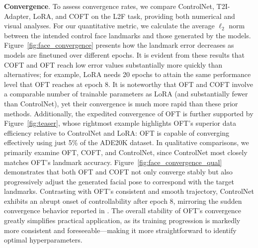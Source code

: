 \textbf{Convergence}. To assess convergence rates, we compare ControlNet, T2I-Adapter, LoRA, and COFT on the L2F task, providing both numerical and visual analyses. For our quantitative metric, we calculate the average $\ell_2$ norm between the intended control face landmarks and those generated by the models. Figure~\ref{fig:face_convergence} presents how the landmark error decreases as models are finetuned over different epochs. It is evident from these results that COFT and OFT reach low error values substantially more quickly than alternatives; for example, LoRA needs 20 epochs to attain the same performance level that OFT reaches at epoch 8. It is noteworthy that OFT and COFT involve a comparable number of trainable parameters as LoRA (and substantially fewer than ControlNet), yet their convergence is much more rapid than these prior methods. Additionally, the expedited convergence of OFT is further supported by Figure~\ref{fig:teaser}, whose rightmost example highlights OFT’s superior data efficiency relative to ControlNet and LoRA: OFT is capable of converging effectively using just 5\% of the ADE20K dataset. In qualitative comparisons, we primarily examine OFT, COFT, and ControlNet, since ControlNet most closely matches OFT’s landmark accuracy. Figure~\ref{fig:face_convergence_qual} demonstrates that both OFT and COFT not only converge stably but also progressively adjust the generated facial pose to correspond with the target landmarks. Contrasting with OFT’s consistent and smooth trajectory, ControlNet exhibits an abrupt onset of controllability after epoch 8, mirroring the sudden convergence behavior reported in \cite{zhang2023adding}. The overall stability of OFT’s convergence greatly simplifies practical application, as its training progression is markedly more consistent and foreseeable—making it more straightforward to identify optimal hyperparameters.

